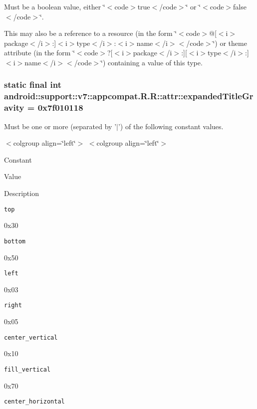 Must be a boolean value, either \char`\"{}$<$code$>$true$<$/code$>$\char`\"{} or \char`\"{}$<$code$>$false$<$/code$>$\char`\"{}. 

This may also be a reference to a resource (in the form \char`\"{}$<$code$>$@\mbox{[}$<$i$>$package$<$/i$>$:\mbox{]}$<$i$>$type$<$/i$>$:$<$i$>$name$<$/i$>$$<$/code$>$\char`\"{}) or theme attribute (in the form \char`\"{}$<$code$>$?\mbox{[}$<$i$>$package$<$/i$>$:\mbox{]}\mbox{[}$<$i$>$type$<$/i$>$:\mbox{]}$<$i$>$name$<$/i$>$$<$/code$>$\char`\"{}) containing a value of this type. \hypertarget{classandroid_1_1support_1_1v7_1_1appcompat_1_1_r_1_1attr_4346f3da5daffd8d364591931416c3bf}{
\subsubsection[{expandedTitleGravity}]{\setlength{\rightskip}{0pt plus 5cm}static final int android::support::v7::appcompat.R.R::attr::expandedTitleGravity = 0x7f010118}}
\label{classandroid_1_1support_1_1v7_1_1appcompat_1_1_r_1_1attr_4346f3da5daffd8d364591931416c3bf}


Must be one or more (separated by '$|$') of the following constant values. \begin{TabularC}{0}
\hline
\end{TabularC}
$<$colgroup align=\char`\"{}left\char`\"{}$>$ $<$colgroup align=\char`\"{}left\char`\"{}$>$ 

Constant

Value

Description 

{\tt top}

0x30

{\tt bottom}

0x50

{\tt left}

0x03

{\tt right}

0x05

{\tt center\_\-vertical}

0x10

{\tt fill\_\-vertical}

0x70

{\tt center\_\-horizontal}

